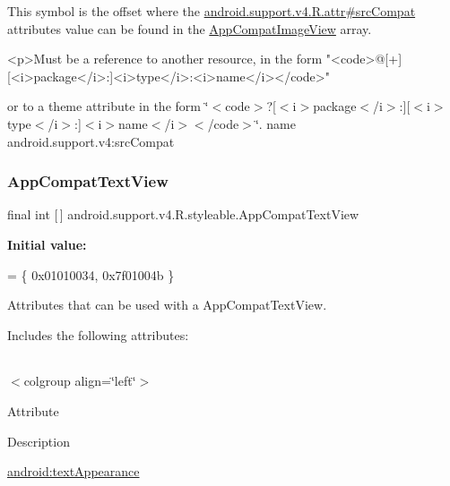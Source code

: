 This symbol is the offset where the \hyperlink{classandroid_1_1support_1_1v4_1_1R_1_1attr_a575eb70d456063d9e25b233ada1f5e71}{android.\+support.\+v4.\+R.\+attr\#src\+Compat} attribute\textquotesingle{}s value can be found in the \hyperlink{classandroid_1_1support_1_1v4_1_1R_1_1styleable_a4d9bb42e7947f32882ba5a45bc43a0a1}{App\+Compat\+Image\+View} array.

\begin{DoxyVerb}      <p>Must be a reference to another resource, in the form "<code>@[+][<i>package</i>:]<i>type</i>:<i>name</i></code>"
\end{DoxyVerb}
 or to a theme attribute in the form \char`\"{}$<$code$>$?\mbox{[}$<$i$>$package$<$/i$>$\+:\mbox{]}\mbox{[}$<$i$>$type$<$/i$>$\+:\mbox{]}$<$i$>$name$<$/i$>$$<$/code$>$\char`\"{}.  name android.\+support.\+v4\+:src\+Compat \mbox{\label{classandroid_1_1support_1_1v4_1_1R_1_1styleable_a88f80fd07175f06b735411ca091754c2}} 
\subsubsection{\texorpdfstring{App\+Compat\+Text\+View}{AppCompatTextView}}
{\footnotesize\ttfamily final int \mbox{[}$\,$\mbox{]} android.\+support.\+v4.\+R.\+styleable.\+App\+Compat\+Text\+View\hspace{0.3cm}{\ttfamily [static]}}

{\bfseries Initial value\+:}
\begin{DoxyCode}
= \{
            0x01010034, 0x7f01004b
        \}
\end{DoxyCode}
Attributes that can be used with a App\+Compat\+Text\+View. 

Includes the following attributes\+:

\tabulinesep=1mm
\begin{longtabu} spread 0pt [c]{*{0}{|X[-1]}|}
\hline
\end{longtabu}
$<$colgroup align=\char`\"{}left\char`\"{}$>$ 

Attribute

Description 

{\ttfamily \hyperlink{classandroid_1_1support_1_1v4_1_1R_1_1styleable_ad4e24f35a933d296cd14f60c381e75b8}{android\+:text\+Appearance}}

